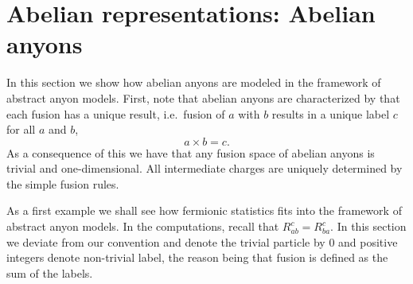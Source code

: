 \section{Abelian representations: Abelian anyons}

In this section we show how abelian anyons are modeled in the framework of abstract anyon models. First, note that abelian anyons are characterized by that each fusion has a unique result, i.e.\ fusion of $a$ with $b$ results in a unique label $c$ for all $a$ and $b$,
\begin{equation}
  a \times b = c.
\end{equation}
As a consequence of this we have that any fusion space of abelian anyons is trivial and one-dimensional. All intermediate charges are uniquely determined by the simple fusion rules.

As a first example we shall see how fermionic statistics fits into the framework of abstract anyon models. In the computations, recall that $R_{ab}^c = R_{ba}^c$. In this section we deviate from our convention and denote the trivial particle by $0$ and positive integers denote non-trivial label, the reason being that fusion is defined as the sum of the labels.

